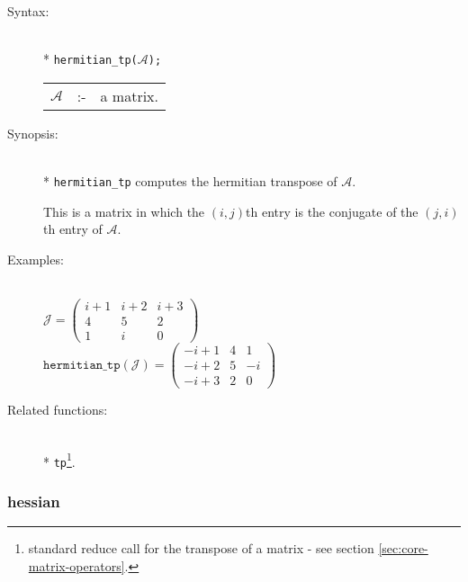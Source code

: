 \begin{description}
\item[Syntax:]\mbox{}\\*
\texttt{hermitian\_tp($\mathcal{A}$);}\\[2mm]
\begin{tabular}{l l l}
$\mathcal{A}$ &:-& a matrix.
\end{tabular}

\item[Synopsis:]\mbox{}\\*
         \texttt{hermitian\_tp} computes the hermitian transpose of $\mathcal{A}$.

This is a matrix in which the $(i,j)$th entry is the conjugate of the $(j,i)$th
entry of $\mathcal{A}$.

\item[Examples:]\mbox{}\\
  \(\mathcal{J} = \begin{pmatrix} i+1 & i+2 & i+3 \\ 4 & 5 & 2 \\ 1 &
    i & 0 \end{pmatrix}\) \\[2mm]
  \(\texttt{hermitian\_tp}(\mathcal{J})  =
  \begin{pmatrix} -i+1 & 4 & 1 \\ -i+2 & 5 & -i \\-i+3 & 2 & 0 \end{pmatrix}\)

\item[Related functions:]\mbox{}\\*
\texttt{tp}\footnote{standard reduce call for the
transpose of a matrix - see section \protect\ref{sec:core-matrix-operators}.}.
\end{description}


\subsubsection{hessian}
\label{linalg:hessian}


